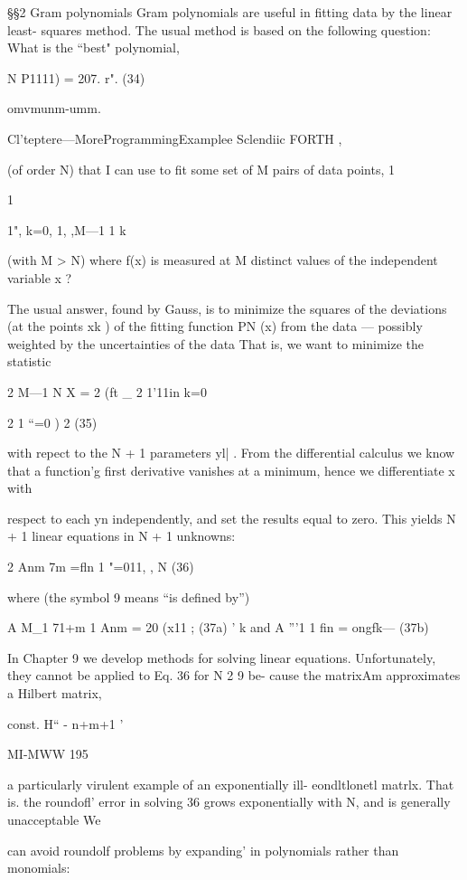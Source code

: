 {{{{ 

 

 

§§2 Gram polynomials
Gram polynomials are useful in ﬁtting data by the linear least-
squares method. The usual method is based on the following
question: What is the “best" polynomial,

N
P1111) = 207. r". (34)

omvmunm-umm.

Cl'teptere—MoreProgrammingExamplee Sclendiic FORTH ,

(of order N) that I can use to ﬁt some set of M pairs of data points, 1

1

{1"}, k=0, 1, ,M—1 1
k

(with M > N) where f(x) is measured at M distinct values of the
independent variable x ?

The usual answer, found by Gauss, is to minimize the squares of
the deviations (at the points xk ) of the ﬁtting function PN (x) from
the data — possibly weighted by the uncertainties of the data That
is, we want to minimize the statistic

2 M—1 N
X = 2 (ft _ 2 1’11in
k=0

2 1
“=0 ) 2 (35)

with repect to the N + 1 parameters yl| .
From the differential calculus we know that a function’g ﬁrst
derivative vanishes at a minimum, hence we differentiate x with

respect to each yn independently, and set the results equal to
zero. This yields N + 1 linear equations in N + 1 unknowns:

2 Anm 7m =ﬂn 1 "=011, , N (36)

where (the symbol 9 means “is deﬁned by”)

A M_1 71+m 1
Anm = 20 (x11 ; (37a)
' k
and
A ”'1 1
ﬁn = ongfk— (37b)

In Chapter 9 we develop methods for solving linear equations.
Unfortunately, they cannot be applied to Eq. 36 for N 2 9 be-
cause the matrixAm approximates a Hilbert matrix,

 

const.
H“ - n+m+1 ’

MI-MWW 195

a particularly virulent example of an exponentially ill-
eondltlonetl matrlx. That is. the roundofl' error in solving 36
grows exponentially with N, and is generally unacceptable We

can avoid roundolf problems by expanding' in polynomials rather
than monomials:

}}}}
